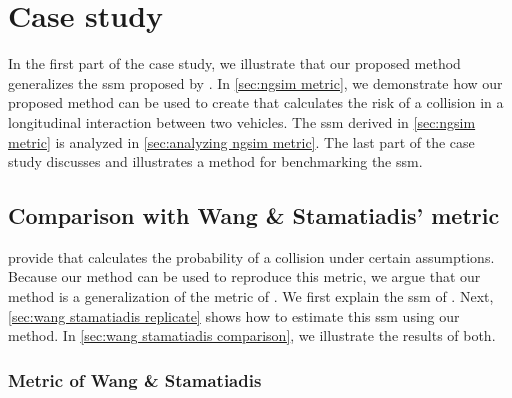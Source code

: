 \section{Case study}
\label{sec:case study}

In the first part of the case study, we illustrate that our proposed method generalizes the \ac{ssm} proposed by \textcite{wang2014evaluation}.
In \cref{sec:ngsim metric}, we demonstrate how our proposed method can be used to create  that calculates the risk of a collision in a longitudinal interaction between two vehicles.
The \ac{ssm} derived in \cref{sec:ngsim metric} is analyzed in \cref{sec:analyzing ngsim metric}.
The last part of the case study discusses and illustrates a method for benchmarking the \ac{ssm}.



\subsection{Comparison with Wang \& Stamatiadis' metric}
\label{sec:wang stamatiadis}

\textcite{wang2014evaluation} provide  that calculates the probability of a collision under certain assumptions. 
Because our method can be used to reproduce this metric, we argue that our method is a generalization of the metric of \textcite{wang2014evaluation}.
We first explain the \ac{ssm} of \textcite{wang2014evaluation}. 
Next, \cref{sec:wang stamatiadis replicate} shows how to estimate this \ac{ssm} using our method.
In \cref{sec:wang stamatiadis comparison}, we illustrate the results of both.



\subsubsection{Metric of Wang \& Stamatiadis}
\label{sec:wang stamatiadis explanation}

